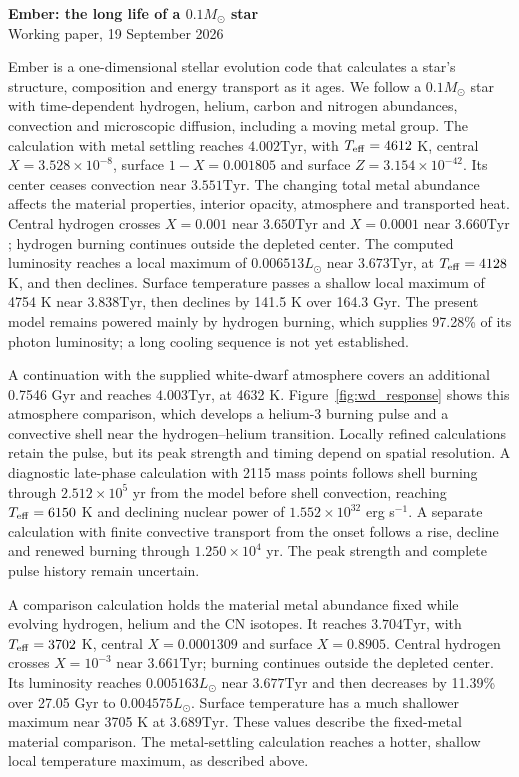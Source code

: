 \documentclass[11pt,letterpaper]{article}
\newcommand{\Ms}{M_\odot}\newcommand{\Rs}{R_\odot}\newcommand{\Ls}{L_\odot}
\newcommand{\Tyr}{\mathrm{Tyr}}
\begin{document}
\begin{center}
{\Large\bfseries Ember: the long life of a $0.1\Ms$ star}\\[8pt]
{\small Working paper, 19 September 2026}
\end{center}

Ember is a one-dimensional stellar evolution code that calculates a star's
structure, composition and energy transport as it ages.
We follow a $0.1\Ms$ star with time-dependent hydrogen, helium, carbon and
nitrogen abundances, convection and microscopic diffusion, including a moving
metal group. The calculation with metal settling reaches $4.002\Tyr$,
with $T_{\rm eff}=4612$ K, central $X=3.528\times10^{-8}$,
surface $1-X=0.001805$ and surface $Z=3.154\times10^{-42}$.
Its center ceases convection near $3.551\Tyr$. The changing total metal abundance affects the material
properties, interior opacity, atmosphere and transported heat. Central hydrogen crosses $X=0.001$
near $3.650\Tyr$ and $X=0.0001$ near $3.660\Tyr$; hydrogen burning
continues outside the depleted center. The computed luminosity reaches a
local maximum of $0.006513\Ls$ near $3.673\Tyr$, at $T_{\rm eff}=4128$ K,
and then declines. Surface temperature passes a shallow local maximum of 4754 K
near $3.838\Tyr$, then declines by 141.5 K
over 164.3 Gyr. The present model remains powered mainly by
hydrogen burning, which supplies 97.28\% of its photon luminosity; a long cooling sequence is not yet established.

A continuation with the supplied white-dwarf atmosphere covers an additional
0.7546 Gyr and reaches $4.003\Tyr$, at 4632 K.
Figure~\ref{fig:wd_response} shows this atmosphere comparison, which develops
a helium-3 burning pulse and a convective shell near the hydrogen--helium
transition. Locally refined calculations retain the pulse, but its peak
strength and timing depend on spatial resolution. A diagnostic late-phase
calculation with 2115 mass points follows shell burning through
$2.512\times10^5$ yr from the model before shell convection, reaching
$T_{\rm eff}=6150$ K and declining nuclear power of
$1.552\times10^{32}$ erg s$^{-1}$. A separate calculation with finite
convective transport from the onset follows a rise, decline and renewed
burning through $1.250\times10^4$ yr. The peak strength and complete pulse history
remain uncertain.



A comparison calculation holds the material metal abundance fixed while
evolving hydrogen, helium and the CN isotopes. It reaches $3.704\Tyr$,
with $T_{\rm eff}=3702$ K, central $X=0.0001309$ and surface $X=0.8905$.
Central hydrogen crosses $X=10^{-3}$ near $3.661\Tyr$; burning continues
outside the depleted center. Its luminosity reaches $0.005163\Ls$ near
$3.677\Tyr$ and then decreases by 11.39\% over 27.05 Gyr to
$0.004575\Ls$. Surface temperature has a much shallower maximum near
3705 K at $3.689\Tyr$. These values describe the fixed-metal material comparison. The metal-settling calculation reaches a hotter, shallow local
temperature maximum, as described above.
\end{document}
